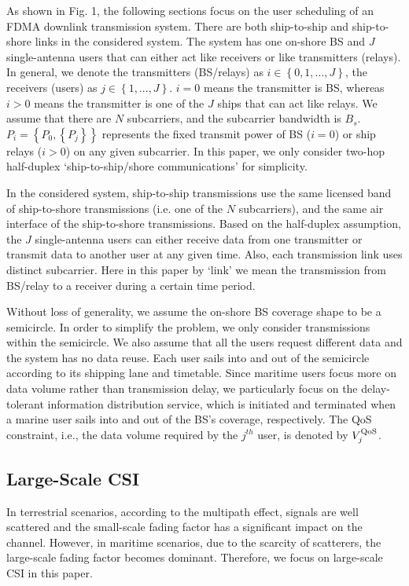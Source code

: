 \documentclass[conference]{IEEEtran}
\begin{document}
 As shown in Fig. 1, the following sections focus on the user scheduling of an FDMA downlink transmission system. There are both ship-to-ship and ship-to-shore links in the considered system. The system has one on-shore BS and $J$ single-antenna users that can either act like receivers or like transmitters (relays). In general, we denote the transmitters (BS/relays) as $i \in \left\{ {0,1,...,J} \right\}$, the receivers (users) as $j \in \left\{ {1,...,J} \right\}$. $i=0$ means the transmitter is BS, whereas $i>0$ means the transmitter is one of the $J$ ships that can act like relays. We assume that there are $N$ subcarriers, and the subcarrier bandwidth is ${B_s}$. $P_i = \left\{ {P_0,\left\{ {P_j} \right\}} \right\}$ represents the fixed transmit power of BS ($i=0$) or ship relays ($i>0$) on any given subcarrier. In this paper, we only consider two-hop half-duplex `ship-to-ship/shore communications' for simplicity. 
 
 In the considered system, ship-to-ship transmissions use the same licensed band of ship-to-shore transmissions (i.e. one of the $N$ subcarriers), and the same air interface of the ship-to-shore transmissions. 
 Based on the half-duplex assumption, the $J$ single-antenna users can either receive data from one transmitter or transmit data to another user at any given time. 
 Also, each transmission link uses distinct subcarrier. Here in this paper by `link' we mean the transmission from BS/relay to a receiver during a certain time period. 
 
 Without loss of generality, we assume the on-shore BS coverage shape to be a semicircle. 
 In order to simplify the problem, we only consider transmissions within the semicircle. We also assume that all the users request different data and the system has no data reuse. 
 Each user sails into and out of the semicircle according to its shipping lane and timetable. 
 Since maritime users focus more on data volume rather than transmission delay, we particularly focus on the delay-tolerant information distribution service, which is initiated and terminated when a marine user sails into and out of the BS's coverage, respectively. 
 The QoS constraint, i.e., the data volume required by the ${j^{th}}$ user, is denoted by $V_j^{\rm{QoS}}$. 
 
 \subsection{Large-Scale CSI}
 
 In terrestrial scenarios, according to the multipath effect, signals are well scattered and the small-scale fading factor has a significant impact on the channel. However, in maritime scenarios, due to the scarcity of scatterers, the large-scale fading factor becomes dominant. Therefore, we focus on large-scale CSI in this paper. 
 
\end{document}
